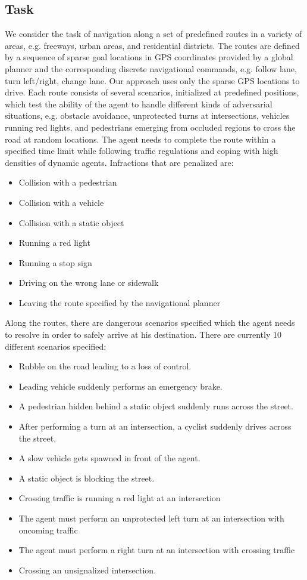 \documentclass[letterpaper, 12pt]{book}
\theoremstyle{definition}
\theoremstyle{definition}
\theoremstyle{definition}
\theoremstyle{definition}
\theoremstyle{definition}
\begin{document}
\subsection{Task}
\label{sec:org71cbfd7}
We consider the task of navigation along a set of predefined routes in a variety
of areas, e.g. freeways, urban areas, and residential districts. The routes are
defined by a sequence of sparse goal locations in GPS coordinates provided by a
global planner and the corresponding discrete navigational commands, e.g. follow
lane, turn left/right, change lane. Our approach uses only the sparse GPS
locations to drive. Each route consists of several scenarios, initialized at
predefined positions, which test the ability of the agent to handle different
kinds of adversarial situations, e.g. obstacle avoidance, unprotected turns at
intersections, vehicles running red lights, and pedestrians emerging from
occluded regions to cross the road at random locations. The agent needs to
complete the route within a specified time limit while following traffic
regulations and coping with high densities of dynamic agents. Infractions that
are penalized are:
\begin{itemize}
\item Collision with a pedestrian
\item Collision with a vehicle
\item Collision with a static object
\item Running a red light
\item Running a stop sign
\item Driving on the wrong lane or sidewalk
\item Leaving the route specified by the navigational planner
\end{itemize}
Along the routes, there are dangerous scenarios specified which the agent needs to
resolve in order to safely arrive at his destination. There are currently 10 different
scenarios specified:
\begin{itemize}
\item Rubble on the road leading to a loss of control.
\item Leading vehicle suddenly performs an emergency brake.
\item A pedestrian hidden behind a static object suddenly runs across the street.
\item After performing a turn at an intersection, a cyclist suddenly drives across
the street.
\item A slow vehicle gets spawned in front of the agent.
\item A static object is blocking the street.
\item Crossing traffic is running a red light at an intersection
\item The agent must perform an unprotected left turn at an intersection with oncoming traffic
\item The agent must perform a right turn at an intersection with crossing traffic
\item Crossing an unsignalized intersection.
\end{itemize}
\end{document}
